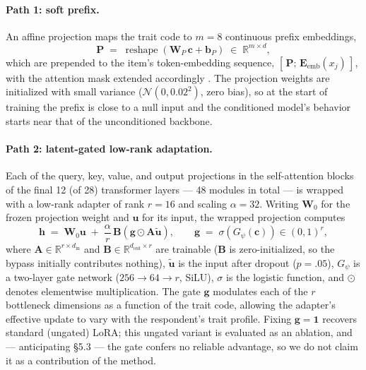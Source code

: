 \documentclass[11pt]{article}
\begin{document}
\paragraph{Path 1: soft prefix.} An affine projection maps the trait code to $m = 8$ continuous prefix embeddings,
\begin{equation}
\mathbf{P} \;=\; \operatorname{reshape}\!\left(\mathbf{W}_{\!P}\,\mathbf{c} + \mathbf{b}_P\right) \;\in\; \mathbb{R}^{m \times d},
\label{eq:prefix}
\end{equation}
which are prepended to the item's token-embedding sequence, $[\,\mathbf{P};\, \mathbf{E}_{\text{emb}}(x_j)\,]$, with the attention mask extended accordingly \citep{lester2021}. The projection weights are initialized with small variance ($\mathcal{N}(0, 0.02^2)$, zero bias), so at the start of training the prefix is close to a null input and the conditioned model's behavior starts near that of the unconditioned backbone.

\paragraph{Path 2: latent-gated low-rank adaptation.} Each of the query, key, value, and output projections in the self-attention blocks of the final 12 (of 28) transformer layers --- 48 modules in total --- is wrapped with a low-rank adapter \citep{hu2021} of rank $r = 16$ and scaling $\alpha = 32$. Writing $\mathbf{W}_0$ for the frozen projection weight and $\mathbf{u}$ for its input, the wrapped projection computes
\begin{equation}
\mathbf{h} \;=\; \mathbf{W}_0 \mathbf{u} \;+\; \frac{\alpha}{r}\, \mathbf{B}\left(\mathbf{g} \odot \mathbf{A}\tilde{\mathbf{u}}\right), \qquad \mathbf{g} \;=\; \sigma\!\left(G_\psi(\mathbf{c})\right) \in (0,1)^r,
\label{eq:lora}
\end{equation}
where $\mathbf{A} \in \mathbb{R}^{r \times d_{\text{in}}}$ and $\mathbf{B} \in \mathbb{R}^{d_{\text{out}} \times r}$ are trainable ($\mathbf{B}$ is zero-initialized, so the bypass initially contributes nothing), $\tilde{\mathbf{u}}$ is the input after dropout ($p = .05$), $G_\psi$ is a two-layer gate network ($256 \to 64 \to r$, SiLU), $\sigma$ is the logistic function, and $\odot$ denotes elementwise multiplication. The gate $\mathbf{g}$ modulates each of the $r$ bottleneck dimensions as a function of the trait code, allowing the adapter's effective update to vary with the respondent's trait profile. Fixing $\mathbf{g} = \mathbf{1}$ recovers standard (ungated) LoRA; this ungated variant is evaluated as an ablation, and --- anticipating \S{}5.3 --- the gate confers no reliable advantage, so we do not claim it as a contribution of the method.
\end{document}
